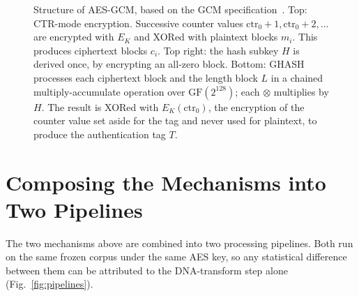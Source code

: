 \documentclass[12pt,a4paper,twoside]{report}
\numberwithin{equation}{chapter}
\begin{document}
\begin{figure}[H]
{}
\caption{Structure of AES-GCM, based on the GCM
specification~\cite{nist80038d}. Top: CTR-mode encryption. Successive
counter values $\mathrm{ctr}_0{+}1, \mathrm{ctr}_0{+}2, \ldots$ are
encrypted with $E_K$ and XORed with plaintext blocks $m_i$. This
produces ciphertext blocks $c_i$. Top right: the hash subkey $H$ is
derived once, by encrypting an all-zero block. Bottom: GHASH processes
each ciphertext block and the length block $L$ in a chained
multiply-accumulate operation over $\mathrm{GF}(2^{128})$; each
$\otimes$ multiplies by $H$. The result is XORed with
$E_K(\mathrm{ctr}_0)$, the encryption of the counter value set aside
for the tag and never used for plaintext, to produce the authentication
tag $T$.}
\label{fig:aes-gcm}
\end{figure}

\section{Composing the Mechanisms into Two Pipelines}
\label{sec:pipelines}
The two mechanisms above are combined into two processing pipelines.
Both run on the same frozen corpus under the same AES key, so any
statistical difference between them can be attributed to the
DNA-transform step alone (Fig.~\ref{fig:pipelines}).
\end{document}
